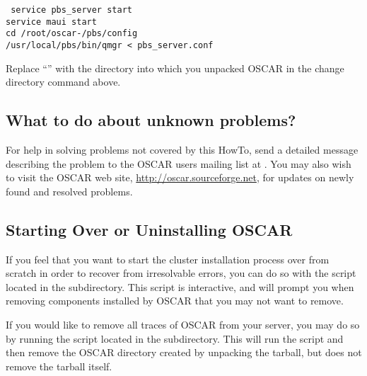 \begchange
\vspace{11pt}
{\tt
  service pbs\_server start \\
\indent  service maui start \\
\indent  cd /root/oscar-\oscarversion/pbs/config \\
\indent  /usr/local/pbs/bin/qmgr < pbs\_server.conf
}
\vspace{11pt}

Replace ``'' with the directory into which you unpacked
\endchange
OSCAR in the change directory command above.

\subsection{What to do about unknown problems?}

For help in solving problems not covered by this HowTo, send a
detailed message describing the problem to the OSCAR users mailing
list at . You may also wish
to visit the OSCAR web site, \url{http://oscar.sourceforge.net}, for
updates on newly found and resolved problems.

\subsection{Starting Over or Uninstalling OSCAR}

If you feel that you want to start the cluster installation process
over from scratch in order to recover from irresolvable errors, you
can do so with the  script located in the
 subdirectory. This script is interactive, and will
prompt you when removing components installed by OSCAR that you may
not want to remove.

If you would like to remove all traces of OSCAR from your server, you
may do so by running the  script located in the
 subdirectory. This will run the 
script and then remove the OSCAR directory created by unpacking the
tarball, but does not remove the tarball itself.


